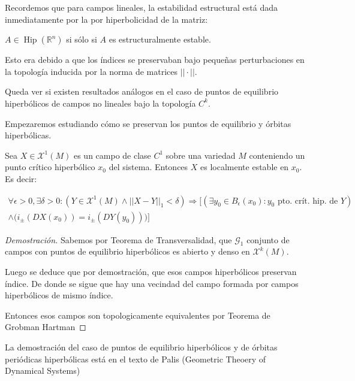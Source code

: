\begin{rmrk}
	Recordemos que para campos lineales, la estabilidad estructural está dada inmediatamente por la por hiperbolicidad de la matriz:
	
	\begin{thm}
		$A \in \operatorname{Hip}(\mathbb{R}^{n})$ si sólo si $A$ es estructuralmente estable.
	\end{thm}
	
	Esto era debido a que los índices se preservaban bajo pequeñas perturbaciones en la topología inducida por la norma de matrices $||\cdot||$. 
	
	Queda ver si existen resultados análogos en el caso de puntos de equilibrio hiperbólicos de campos no lineales bajo la topología $C^k$. 
	
	Empezaremos estudiando cómo se preservan los puntos de equilibrio y órbitas hiperbólicas.
\end{rmrk}




\begin{thm}
	Sea $X\in \mathcal{X}^1(M)$ es un campo de clase $C^1$ sobre una variedad $M$ conteniendo un punto crítico hiperbólico $x_0$ del sistema. Entonces $X$ es localmente estable en $x_0$. Es decir:
	
	\begin{align*}
		\forall \epsilon>0,\exists\delta >0:
		(Y\in \mathcal{X}^1(M) \land ||X-Y||_1 < \delta) \Rightarrow[ (\exists y_0 \in B_\epsilon(x_0):y_0 \text{ pto. crít. hip. de }   Y)\\
		\land \bigg(i_\pm(DX(x_0)) =i_\pm(DY(y_0)) \bigg)]
	\end{align*}
\end{thm}

\begin{proof}[Demostración]
	Sabemos  por Teorema de Transversalidad, que $\mathcal{G}_1$ conjunto de campos con puntos de equilibrio hiperbólicos es abierto y denso en $\mathcal{X}^k(M)$. 
	
	
	Luego se deduce que por demostración, que esos campos hiperbólicos preservan índice. De donde se sigue que hay una vecindad del campo formada por campos hiperbólicos de mismo índice. 
	
	Entonces esos campos  son topologicamente equivalentes por Teorema de Grobman Hartman
\end{proof}

\begin{rmrk}
	La demostración del caso de puntos de equilibrio hiperbólicos y de órbitas periódicas hiperbólicas está en el texto de Palis (Geometric Theoery of Dynamical Systems)
\end{rmrk}

